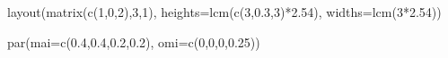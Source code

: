 \documentclass[11pt,]{article}
\newenvironment{Shaded}{}{}
\newcommand{\DataTypeTok}[1]{#1}
\newcommand{\DecValTok}[1]{#1}
\newcommand{\FloatTok}[1]{#1}
\newcommand{\KeywordTok}[1]{\textcolor[rgb]{0.00,0.00,1.00}{#1}}
\newcommand{\NormalTok}[1]{#1}
\newcommand{\OperatorTok}[1]{#1}
\begin{document}
\begin{Shaded}
\begin{Highlighting}[]
\KeywordTok{layout}\NormalTok{(}\KeywordTok{matrix}\NormalTok{(}\KeywordTok{c}\NormalTok{(}\DecValTok{1}\NormalTok{,}\DecValTok{0}\NormalTok{,}\DecValTok{2}\NormalTok{),}\DecValTok{3}\NormalTok{,}\DecValTok{1}\NormalTok{),}
       \DataTypeTok{heights=}\KeywordTok{lcm}\NormalTok{(}\KeywordTok{c}\NormalTok{(}\DecValTok{3}\NormalTok{,}\FloatTok{0.3}\NormalTok{,}\DecValTok{3}\NormalTok{)}\OperatorTok{*}\FloatTok{2.54}\NormalTok{),}
       \DataTypeTok{widths=}\KeywordTok{lcm}\NormalTok{(}\DecValTok{3}\OperatorTok{*}\FloatTok{2.54}\NormalTok{))}

\KeywordTok{par}\NormalTok{(}\DataTypeTok{mai=}\KeywordTok{c}\NormalTok{(}\FloatTok{0.4}\NormalTok{,}\FloatTok{0.4}\NormalTok{,}\FloatTok{0.2}\NormalTok{,}\FloatTok{0.2}\NormalTok{), }\DataTypeTok{omi=}\KeywordTok{c}\NormalTok{(}\DecValTok{0}\NormalTok{,}\DecValTok{0}\NormalTok{,}\DecValTok{0}\NormalTok{,}\FloatTok{0.25}\NormalTok{))}


\end{Highlighting}
\end{Shaded}
\end{document}

